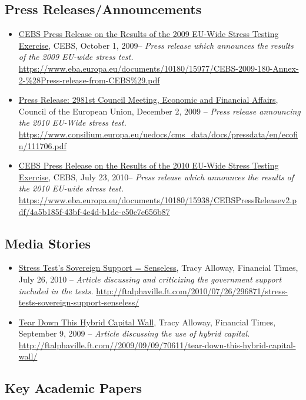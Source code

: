 \documentclass[12pt]{article}
\begin{document}
\subsection{Press Releases/Announcements}

\begin{itemize}
\item
\ul{CEBS Press Release on the Results of the 2009 EU-Wide Stress Testing Exercise}, CEBS, October 1, 2009-- \emph{Press release which
 announces the results of the 2009 EU-wide stress test.} \url{https://www.eba.europa.eu/documents/10180/15977/CEBS-2009-180-Annex-2-\%28Press-release-from-CEBS\%29.pdf}
\item
\ul{Press Release: 2981st Council Meeting, Economic and Financial Affairs}, Council of the European Union, December 2, 2009 -- \emph{Press release
 announcing the 2010 EU-Wide stress test.} \url{https://www.consilium.europa.eu/uedocs/cms_data/docs/pressdata/en/ecofin/111706.pdf}
\item
\ul{CEBS Press Release on the Results of the 2010 EU-Wide Stress Testing Exercise}, CEBS, July 23, 2010-- \emph{Press release which
 announces the results of the 2010 EU-wide stress test.} \url{https://www.eba.europa.eu/documents/10180/15938/CEBSPressReleasev2.pdf/4a5b185f-43bf-4e4d-b1de-c50c7e656b87}
\end{itemize}

\subsection{Media Stories}

\begin{itemize}
\item
\ul{Stress Test's Sovereign Support = Senseless}, Tracy Alloway, Financial Times, July 26,
 2010 -- \emph{Article discussing and criticizing the government support included in the tests.} \url{http://ftalphaville.ft.com/2010/07/26/296871/stress-tests-sovereign-support-senseless/}
\item
\ul{Tear Down This Hybrid Capital Wall}, Tracy Alloway, Financial Times, September 9, 2009 -- \emph{Article discussing the use of hybrid capital.} \url{http://ftalphaville.ft.com//2009/09/09/70611/tear-down-this-hybrid-capital-wall/}

\end{itemize}

\subsection{Key Academic Papers}
\end{document}
